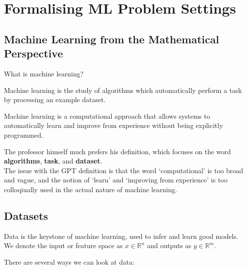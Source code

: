 \chapter{Formalising ML Problem Settings}



\section{Machine Learning from the Mathematical Perspective}

What is machine learning?


\begin{tcolorbox}[title=Professor, colback=yellow!20!white, colframe=orange!35!black, sharp corners]
    Machine learning is the study of algorithms which automatically perform a task by processing an example dataset.
\end{tcolorbox}


\begin{tcolorbox}[title=ChatGPT, colback=purple!10!white, colframe=violet!40!black, sharp corners]
    Machine learning is a computational approach that allows systems to automatically learn and improve from experience without being explicitly programmed.
\end{tcolorbox}

The professor himself much prefers his definition, which focuses on the word \textbf{algorithms}, \textbf{task}, and \textbf{dataset}.\\

The issue with the GPT definition is that the word `computational' is too broad and vague, and the notion of `learn' and `improving from experience' is too colloqiually used in the actual nature of machine learning.

\section{Datasets}
Data is the keystone of machine learning, used to infer and learn good models. We denote the input or feature space as $x \in \mathbb{R}^n$ and outputs as $y \in \mathbb{R}^m$.

There are several ways we can look at data:

